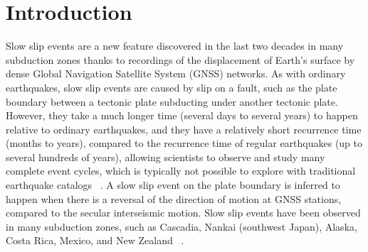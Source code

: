 \documentclass[draft]{agujournal2018}
\begin{document}
%
%
%
%


\section{Introduction}

Slow slip events are a new feature discovered in the last two decades in many subduction zones thanks to recordings of the displacement of Earth's surface by dense Global Navigation Satellite System (GNSS) networks. As with ordinary earthquakes, slow slip events are caused by slip on a fault, such as the plate boundary between a tectonic plate subducting under another tectonic plate. However, they take a much longer time (several days to several years) to happen relative to ordinary earthquakes, and they have a relatively short recurrence time (months to years), compared to the recurrence time of regular earthquakes (up to several hundreds of years), allowing scientists to observe and study many complete event cycles, which is typically not possible to explore with traditional earthquake catalogs ~\citep{BER_2011}. A slow slip event on the plate boundary is inferred to happen when there is a reversal of the direction of motion at GNSS stations, compared to the secular interseismic motion. Slow slip events have been observed in many subduction zones, such as Cascadia, Nankai (southwest Japan), Alaska, Costa Rica, Mexico, and New Zealand ~\citep{BER_2011,AUD_2016}. \\
\end{document}
